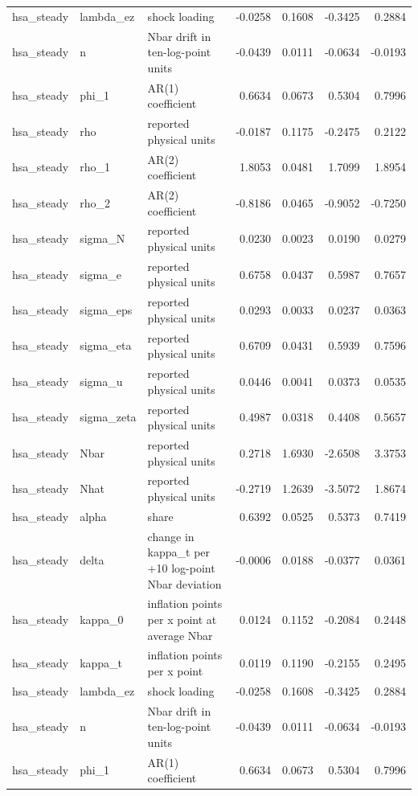 \begin{tabular}{lllrrrr}
hsa\_steady & lambda\_ez & shock loading & -0.0258 & 0.1608 & -0.3425 & 0.2884 \\
hsa\_steady & n & Nbar drift in ten-log-point units & -0.0439 & 0.0111 & -0.0634 & -0.0193 \\
hsa\_steady & phi\_1 & AR(1) coefficient & 0.6634 & 0.0673 & 0.5304 & 0.7996 \\
hsa\_steady & rho & reported physical units & -0.0187 & 0.1175 & -0.2475 & 0.2122 \\
hsa\_steady & rho\_1 & AR(2) coefficient & 1.8053 & 0.0481 & 1.7099 & 1.8954 \\
hsa\_steady & rho\_2 & AR(2) coefficient & -0.8186 & 0.0465 & -0.9052 & -0.7250 \\
hsa\_steady & sigma\_N & reported physical units & 0.0230 & 0.0023 & 0.0190 & 0.0279 \\
hsa\_steady & sigma\_e & reported physical units & 0.6758 & 0.0437 & 0.5987 & 0.7657 \\
hsa\_steady & sigma\_eps & reported physical units & 0.0293 & 0.0033 & 0.0237 & 0.0363 \\
hsa\_steady & sigma\_eta & reported physical units & 0.6709 & 0.0431 & 0.5939 & 0.7596 \\
hsa\_steady & sigma\_u & reported physical units & 0.0446 & 0.0041 & 0.0373 & 0.0535 \\
hsa\_steady & sigma\_zeta & reported physical units & 0.4987 & 0.0318 & 0.4408 & 0.5657 \\
hsa\_steady & Nbar & reported physical units & 0.2718 & 1.6930 & -2.6508 & 3.3753 \\
hsa\_steady & Nhat & reported physical units & -0.2719 & 1.2639 & -3.5072 & 1.8674 \\
hsa\_steady & alpha & share & 0.6392 & 0.0525 & 0.5373 & 0.7419 \\
hsa\_steady & delta & change in kappa\_t per +10 log-point Nbar deviation & -0.0006 & 0.0188 & -0.0377 & 0.0361 \\
hsa\_steady & kappa\_0 & inflation points per x point at average Nbar & 0.0124 & 0.1152 & -0.2084 & 0.2448 \\
hsa\_steady & kappa\_t & inflation points per x point & 0.0119 & 0.1190 & -0.2155 & 0.2495 \\
hsa\_steady & lambda\_ez & shock loading & -0.0258 & 0.1608 & -0.3425 & 0.2884 \\
hsa\_steady & n & Nbar drift in ten-log-point units & -0.0439 & 0.0111 & -0.0634 & -0.0193 \\
hsa\_steady & phi\_1 & AR(1) coefficient & 0.6634 & 0.0673 & 0.5304 & 0.7996 \\

\end{tabular}
